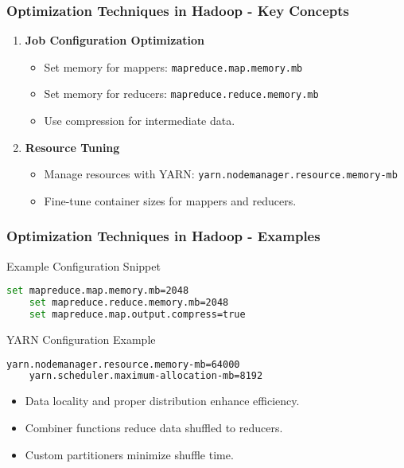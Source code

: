 \documentclass{beamer}
\begin{document}
\begin{frame}[fragile]
    \frametitle{Optimization Techniques in Hadoop - Key Concepts}
    \begin{enumerate}
        \item \textbf{Job Configuration Optimization}
        \begin{itemize}
            \item Set memory for mappers: \texttt{mapreduce.map.memory.mb}
            \item Set memory for reducers: \texttt{mapreduce.reduce.memory.mb}
            \item Use compression for intermediate data.
        \end{itemize}
      
        \item \textbf{Resource Tuning}
        \begin{itemize}
            \item Manage resources with YARN: \texttt{yarn.nodemanager.resource.memory-mb}
            \item Fine-tune container sizes for mappers and reducers.
        \end{itemize}
    \end{enumerate}
\end{frame}

\begin{frame}[fragile]
    \frametitle{Optimization Techniques in Hadoop - Examples}
    \begin{block}{Example Configuration Snippet}
    \begin{lstlisting}[language=bash]
    set mapreduce.map.memory.mb=2048
    set mapreduce.reduce.memory.mb=2048
    set mapreduce.map.output.compress=true
    \end{lstlisting}
    \end{block}

    \begin{block}{YARN Configuration Example}
    \begin{lstlisting}[language=bash]
    yarn.nodemanager.resource.memory-mb=64000
    yarn.scheduler.maximum-allocation-mb=8192
    \end{lstlisting}
    \end{block}

    \begin{itemize}
        \item Data locality and proper distribution enhance efficiency.
        \item Combiner functions reduce data shuffled to reducers.
        \item Custom partitioners minimize shuffle time.
    \end{itemize}
\end{frame}
\end{document}

